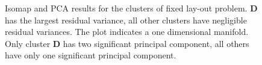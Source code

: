  



\begin{figure}[ht]\begin{center}
    \caption{Isomap and PCA results for the clusters of fixed lay-out
      problem. \textbf{D} has the largest residual variance, all other
      clusters have negligible residual variances. The plot indicates a one
      dimensional manifold. Only cluster \textbf{D} has two significant
      principal component, all others have only one significant principal
      component.}
    \label{gt11clustersVar}
  \end{center}
\end{figure}


